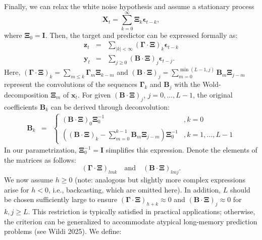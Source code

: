 \documentclass[11pt,a4paper]{article}
\begin{document}
Finally, we can relax the white noise hypothesis and assume a stationary process 
\begin{equation}\label{eq:x_m_st}
\mathbf{X}_t = \sum_{k=0}^\infty \boldsymbol{\Xi}_k \boldsymbol{\epsilon}_{t-k},
\end{equation}
where $\boldsymbol{\Xi}_0 = \mathbf{I}$. Then, the target and predictor can be expressed formally as:
\begin{eqnarray*}
\mathbf{z}_t&=&\sum_{|k|<\infty}(\boldsymbol{\Gamma}\cdot\boldsymbol{\Xi})_k \boldsymbol{\epsilon}_{t-k}\\
\mathbf{y}_t&=&\sum_{j\geq 0} (\mathbf{B}\cdot\boldsymbol{\Xi})_j\boldsymbol{\epsilon}_{t-j}.
\end{eqnarray*} 
Here, $(\boldsymbol{\Gamma}\cdot\boldsymbol{\Xi})_k =\sum_{m\leq k}\boldsymbol{\Gamma}_m\boldsymbol{\Xi}_{k-m}$ and $(\mathbf{B}\cdot\boldsymbol{\Xi})_j=\sum_{m=0}^{\min(L-1,j)}\mathbf{B}_m \boldsymbol{\Xi}_{j-m} $ represent the convolutions of the sequences $\boldsymbol{\Gamma}_k$ and $\mathbf{B}_j$ with the Wold-decomposition $\boldsymbol{\Xi}_m$ of $\mathbf{x}_t$. For given $(\mathbf{B}\cdot\boldsymbol{\Xi})_j$, $j=0,...,L-1$, the original coefficients $\mathbf{B}_{k}$ can be derived through deconvolution:
\begin{eqnarray}\label{eq:con_inv}
\mathbf{B}_{k}&=&\left\{\begin{array}{cc}(\mathbf{B}\cdot\boldsymbol{\Xi})_{0}\boldsymbol{\Xi}_0^{-1}&,k=0\\
\left((\mathbf{B}\cdot\boldsymbol{\Xi})_{k}-\sum_{m=0}^{k-1}\mathbf{B}_m \boldsymbol{\Xi}_{j-m}\right)\boldsymbol{\Xi}_0^{-1}&,k=1,...,L-1
\end{array}\right.
\end{eqnarray}
In our parametrization, $\boldsymbol{\Xi}_0^{-1} = \mathbf{I}$ simplifies this expression. Denote the elements of the matrices as follows:
\[
(\boldsymbol{\Gamma}\cdot\boldsymbol{\Xi})_{lmk}
 \quad \text{and} \quad (\mathbf{B}\cdot\boldsymbol{\Xi})_{lmj}.
 \] 
We now assume $h\geq 0$ (note: analogous but slightly more complex expressions arise for $h < 0$, i.e., backcasting, which are omitted here). In addition, $L$ should be chosen sufficiently large to ensure $(\boldsymbol{\Gamma} \cdot \boldsymbol{\Xi})_{h+k} \approx 0$ and $(\mathbf{B} \cdot \boldsymbol{\Xi})_j \approx 0$ for $k,j \geq L$. This restriction is typically satisfied in practical applications; otherwise, the criterion can be generalized to accommodate atypical long-memory prediction problems (see Wildi 2025). We define:
\end{document}
